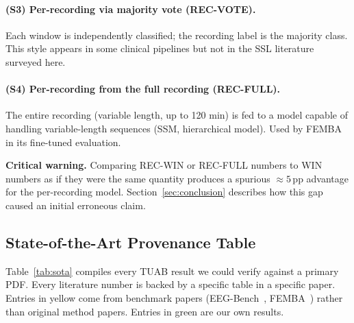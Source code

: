 \documentclass[11pt,a4paper]{article}
\begin{document}
\paragraph{(S3) Per-recording via majority vote (REC-VOTE).}
Each window is independently classified; the recording label is the majority class.
This style appears in some clinical pipelines but not in the SSL literature surveyed here.

\paragraph{(S4) Per-recording from the full recording (REC-FULL).}
The entire recording (variable length, up to 120 min) is fed to a model capable of
handling variable-length sequences (SSM, hierarchical model).
Used by FEMBA~\cite{femba} in its fine-tuned evaluation.

\medskip
\noindent\textbf{Critical warning.}
Comparing REC-WIN or REC-FULL numbers to WIN numbers as if they were the same quantity
produces a spurious ${\approx}5$\,pp advantage for the per-recording model.
Section~\ref{sec:conclusion} describes how this gap caused an initial erroneous claim.

\subsection{State-of-the-Art Provenance Table}
\label{sec:sota_table}

Table~\ref{tab:sota} compiles every TUAB result we could verify against a primary PDF.
Every literature number is backed by a specific table in a specific paper.
Entries in \colorbox{sota}{yellow} come from benchmark papers (EEG-Bench~\cite{eeg_bench},
FEMBA~\cite{femba}) rather than original method papers.
Entries in \colorbox{ours}{green} are our own results.
\end{document}
